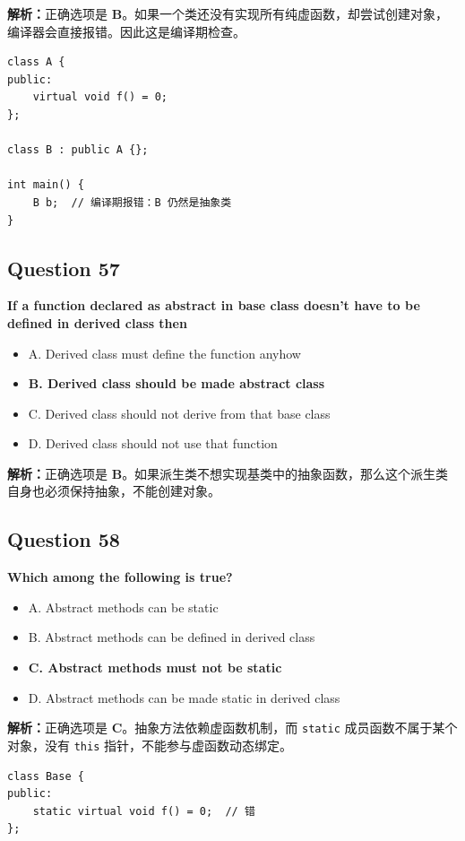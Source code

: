 \documentclass[11pt, a4paper]{article}
\begin{document}
\textbf{解析：}正确选项是 \textbf{B}。如果一个类还没有实现所有纯虚函数，却尝试创建对象，编译器会直接报错。因此这是编译期检查。
\begin{lstlisting}
class A {
public:
    virtual void f() = 0;
};

class B : public A {};

int main() {
    B b;  // 编译期报错：B 仍然是抽象类
}
\end{lstlisting}


\subsection*{Question 57}
\textbf{If a function declared as abstract in base class doesn’t have to be defined in derived class then \underline{\hspace{2cm}}}
\begin{itemize}
    \item A. Derived class must define the function anyhow
    \item \textbf{B. Derived class should be made abstract class}
    \item C. Derived class should not derive from that base class
    \item D. Derived class should not use that function
\end{itemize}

\textbf{解析：}正确选项是 \textbf{B}。如果派生类不想实现基类中的抽象函数，那么这个派生类自身也必须保持抽象，不能创建对象。


\subsection*{Question 58}
\textbf{Which among the following is true?}
\begin{itemize}
    \item A. Abstract methods can be static
    \item B. Abstract methods can be defined in derived class
    \item \textbf{C. Abstract methods must not be static}
    \item D. Abstract methods can be made static in derived class
\end{itemize}

\textbf{解析：}正确选项是 \textbf{C}。抽象方法依赖虚函数机制，而 \texttt{static} 成员函数不属于某个对象，没有 \texttt{this} 指针，不能参与虚函数动态绑定。
\begin{lstlisting}
class Base {
public:
    static virtual void f() = 0;  // 错
};
\end{lstlisting}
\end{document}
